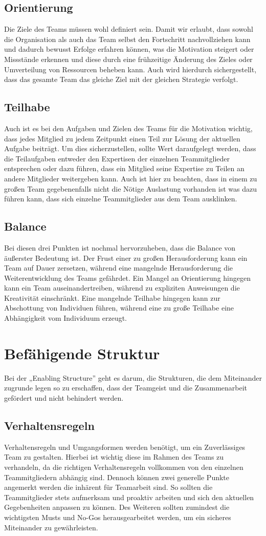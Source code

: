 \subsection{Orientierung}
Die Ziele des Teams müssen wohl definiert sein. Damit wir erlaubt, dass sowohl die Organisation als auch das Team selbst den Fortschritt nachvollziehen kann und dadurch bewusst Erfolge erfahren können, was die Motivation steigert oder Missstände erkennen und diese durch eine frühzeitige Änderung des Zieles oder Umverteilung von Ressourcen beheben kann. Auch wird hierdurch sichergestellt, dass das gesamte Team das gleiche Ziel mit der gleichen Strategie verfolgt.
\subsection{Teilhabe}
Auch ist es bei den Aufgaben und Zielen des Teams für die Motivation wichtig, dass jedes Mitglied zu jedem Zeitpunkt einen Teil zur Lösung der aktuellen Aufgabe beiträgt. Um dies sicherzustellen, sollte Wert daraufgelegt werden, dass die Teilaufgaben entweder den Expertisen der einzelnen Teammitglieder entsprechen oder dazu führen, dass ein Mitglied seine Expertise zu Teilen an andere Mitglieder weitergeben kann. Auch ist hier zu beachten, dass in einem zu großen Team gegebenenfalls nicht die Nötige Auslastung vorhanden ist was dazu führen kann, dass sich einzelne Teammitglieder aus dem Team ausklinken.
\subsection{Balance}
Bei diesen drei Punkten ist nochmal hervorzuheben, dass die Balance von äußerster Bedeutung ist. Der Frust einer zu großen Herausforderung kann ein Team auf Dauer zersetzen, während eine mangelnde Herausforderung die Weiterentwicklung des Teams gefährdet. Ein Mangel an Orientierung hingegen kann ein Team auseinandertreiben, während zu expliziten Anweisungen die Kreativität einschränkt.  Eine mangelnde Teilhabe hingegen kann zur Abschottung von Individuen führen, während eine zu große Teilhabe eine Abhängigkeit vom Individuum erzeugt.

\section{Befähigende Struktur}
Bei der „Enabling Structure” geht es darum, die Strukturen, die dem Miteinander zugrunde legen so zu erschaffen, dass der Teamgeist und die Zusammenarbeit gefördert und nicht behindert werden.
\subsection{Verhaltensregeln}
Verhaltensregeln und Umgangsformen werden benötigt, um ein Zuverlässiges Team zu gestalten. Hierbei ist wichtig diese im Rahmen des Teams zu verhandeln, da die richtigen Verhaltensregeln vollkommen von den einzelnen Teammitgliedern abhängig sind. Dennoch können zwei generelle Punkte angemerkt werden die inhärent für Teamarbeit sind. So sollten die Teammitglieder stets aufmerksam und proaktiv arbeiten und sich den aktuellen Gegebenheiten anpassen zu können. Des Weiteren sollten zumindest die wichtigsten Musts und No-Gos herausgearbeitet werden, um ein sicheres Miteinander zu gewährleisten.
